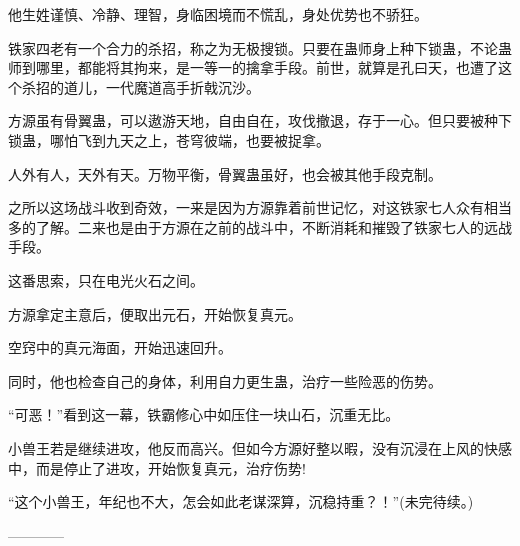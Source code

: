 \begin{this_body}
他生姓谨慎、冷静、理智，身临困境而不慌乱，身处优势也不骄狂。

铁家四老有一个合力的杀招，称之为无极搜锁。只要在蛊师身上种下锁蛊，不论蛊师到哪里，都能将其拘来，是一等一的擒拿手段。前世，就算是孔曰天，也遭了这个杀招的道儿，一代魔道高手折戟沉沙。

方源虽有骨翼蛊，可以遨游天地，自由自在，攻伐撤退，存于一心。但只要被种下锁蛊，哪怕飞到九天之上，苍穹彼端，也要被捉拿。

人外有人，天外有天。万物平衡，骨翼蛊虽好，也会被其他手段克制。

之所以这场战斗收到奇效，一来是因为方源靠着前世记忆，对这铁家七人众有相当多的了解。二来也是由于方源在之前的战斗中，不断消耗和摧毁了铁家七人的远战手段。

这番思索，只在电光火石之间。

方源拿定主意后，便取出元石，开始恢复真元。

空窍中的真元海面，开始迅速回升。

同时，他也检查自己的身体，利用自力更生蛊，治疗一些险恶的伤势。

“可恶！”看到这一幕，铁霸修心中如压住一块山石，沉重无比。

小兽王若是继续进攻，他反而高兴。但如今方源好整以暇，没有沉浸在上风的快感中，而是停止了进攻，开始恢复真元，治疗伤势!

“这个小兽王，年纪也不大，怎会如此老谋深算，沉稳持重？！”(未完待续。)

------------

\end{this_body}

